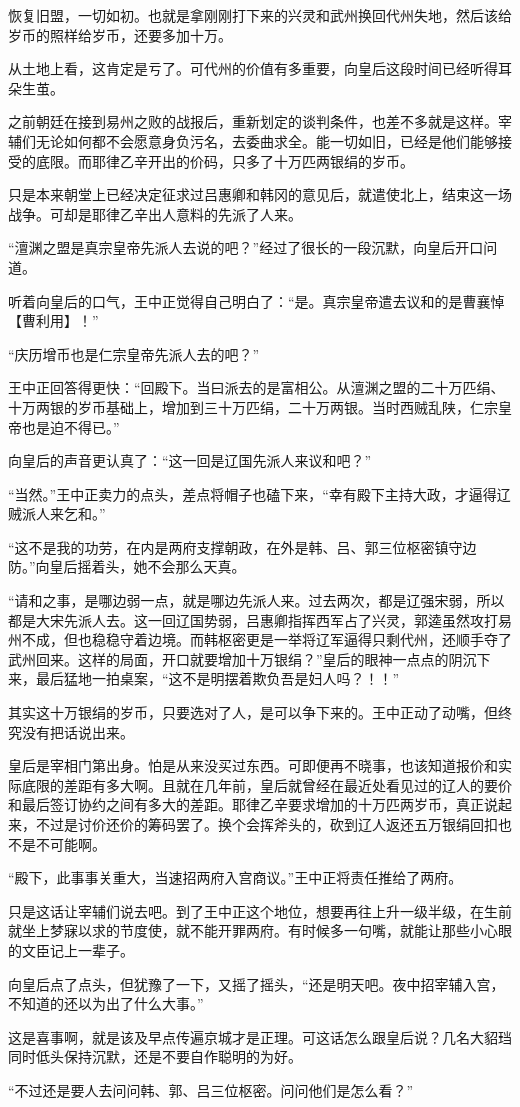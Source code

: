 恢复旧盟，一切如初。也就是拿刚刚打下来的兴灵和武州换回代州失地，然后该给岁币的照样给岁币，还要多加十万。

从土地上看，这肯定是亏了。可代州的价值有多重要，向皇后这段时间已经听得耳朵生茧。

之前朝廷在接到易州之败的战报后，重新划定的谈判条件，也差不多就是这样。宰辅们无论如何都不会愿意身负污名，去委曲求全。能一切如旧，已经是他们能够接受的底限。而耶律乙辛开出的价码，只多了十万匹两银绢的岁币。

只是本来朝堂上已经决定征求过吕惠卿和韩冈的意见后，就遣使北上，结束这一场战争。可却是耶律乙辛出人意料的先派了人来。

“澶渊之盟是真宗皇帝先派人去说的吧？”经过了很长的一段沉默，向皇后开口问道。

听着向皇后的口气，王中正觉得自己明白了：“是。真宗皇帝遣去议和的是曹襄悼【曹利用】！”

“庆历增币也是仁宗皇帝先派人去的吧？”

王中正回答得更快：“回殿下。当曰派去的是富相公。从澶渊之盟的二十万匹绢、十万两银的岁币基础上，增加到三十万匹绢，二十万两银。当时西贼乱陕，仁宗皇帝也是迫不得已。”

向皇后的声音更认真了：“这一回是辽国先派人来议和吧？”

“当然。”王中正卖力的点头，差点将帽子也磕下来，“幸有殿下主持大政，才逼得辽贼派人来乞和。”

“这不是我的功劳，在内是两府支撑朝政，在外是韩、吕、郭三位枢密镇守边防。”向皇后摇着头，她不会那么天真。

“请和之事，是哪边弱一点，就是哪边先派人来。过去两次，都是辽强宋弱，所以都是大宋先派人去。这一回辽国势弱，吕惠卿指挥西军占了兴灵，郭逵虽然攻打易州不成，但也稳稳守着边境。而韩枢密更是一举将辽军逼得只剩代州，还顺手夺了武州回来。这样的局面，开口就要增加十万银绢？”皇后的眼神一点点的阴沉下来，最后猛地一拍桌案，“这不是明摆着欺负吾是妇人吗？！！”

其实这十万银绢的岁币，只要选对了人，是可以争下来的。王中正动了动嘴，但终究没有把话说出来。

皇后是宰相门第出身。怕是从来没买过东西。可即便再不晓事，也该知道报价和实际底限的差距有多大啊。且就在几年前，皇后就曾经在最近处看见过的辽人的要价和最后签订协约之间有多大的差距。耶律乙辛要求增加的十万匹两岁币，真正说起来，不过是讨价还价的筹码罢了。换个会挥斧头的，砍到辽人返还五万银绢回扣也不是不可能啊。

“殿下，此事事关重大，当速招两府入宫商议。”王中正将责任推给了两府。

只是这话让宰辅们说去吧。到了王中正这个地位，想要再往上升一级半级，在生前就坐上梦寐以求的节度使，就不能开罪两府。有时候多一句嘴，就能让那些小心眼的文臣记上一辈子。

向皇后点了点头，但犹豫了一下，又摇了摇头，“还是明天吧。夜中招宰辅入宫，不知道的还以为出了什么大事。”

这是喜事啊，就是该及早点传遍京城才是正理。可这话怎么跟皇后说？几名大貂珰同时低头保持沉默，还是不要自作聪明的为好。

“不过还是要人去问问韩、郭、吕三位枢密。问问他们是怎么看？”
